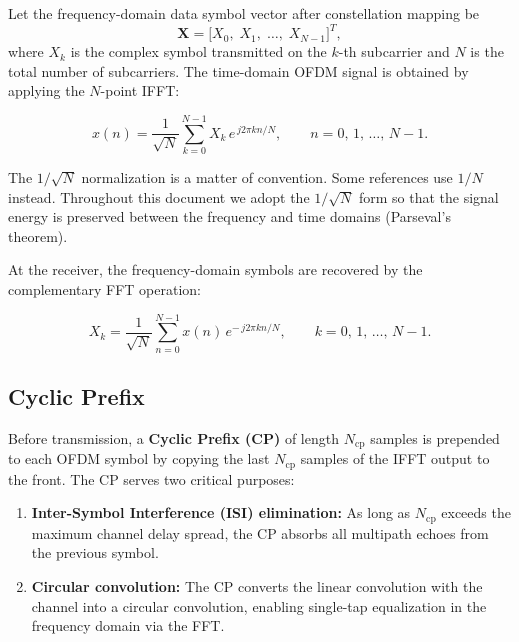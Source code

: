 Let the frequency-domain data symbol vector after constellation mapping be
\begin{equation*}
    \bm{X} = \bigl[X_0,\; X_1,\; \dots,\; X_{N-1}\bigr]^T,
\end{equation*}
where $X_k$ is the complex symbol transmitted on the $k$-th subcarrier and
$N$ is the total number of subcarriers.  The time-domain OFDM signal is
obtained by applying the $N$-point IFFT:
\begin{keyresult}
\begin{equation}
    x(n) = \frac{1}{\sqrt{N}} \sum_{k=0}^{N-1} X_k \, e^{\,j2\pi kn/N},
    \qquad n = 0,\, 1,\, \dots,\, N-1.
\end{equation}
\end{keyresult}

\begin{keyinsight}
    The $1/\!\sqrt{N}$ normalization is a matter of convention.
    Some references use $1/N$ instead.
    Throughout this document we adopt the $1/\!\sqrt{N}$ form
    so that the signal energy is preserved between the frequency and
    time domains (Parseval's theorem).
\end{keyinsight}

At the receiver, the frequency-domain symbols are recovered by the complementary
FFT operation:
\begin{keyresult}
\begin{equation}
    X_k = \frac{1}{\sqrt{N}} \sum_{n=0}^{N-1} x(n) \, e^{-\,j2\pi kn/N},
    \qquad k = 0,\, 1,\, \dots,\, N-1.
\end{equation}
\end{keyresult}

\subsection{Cyclic Prefix}

Before transmission, a \textbf{Cyclic Prefix (CP)} of length $N_{\mathrm{cp}}$
samples is prepended to each OFDM symbol by copying the last
$N_{\mathrm{cp}}$ samples of the IFFT output to the front.  The CP serves two
critical purposes:
\begin{enumerate}
    \item \textbf{Inter-Symbol Interference (ISI) elimination:}
          As long as $N_{\mathrm{cp}}$ exceeds the maximum channel delay
          spread, the CP absorbs all multipath echoes from the previous symbol.
    \item \textbf{Circular convolution:}
          The CP converts the linear convolution with the channel into a
          circular convolution, enabling single-tap equalization in the
          frequency domain via the FFT.
\end{enumerate}

